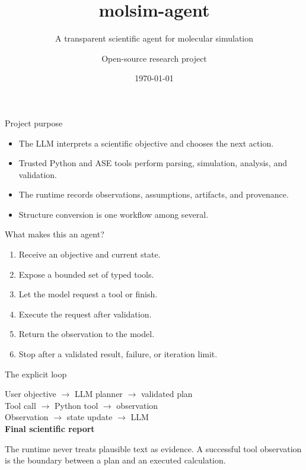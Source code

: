 \documentclass[aspectratio=169,11pt]{beamer}
\title{molsim-agent}
\subtitle{A transparent scientific agent for molecular simulation}
\author{Open-source research project}
\date{\today}
\begin{document}
\begin{frame}
  \titlepage
\end{frame}

\begin{frame}{Project purpose}
\begin{itemize}
  \item The LLM interprets a scientific objective and chooses the next action.
  \item Trusted Python and ASE tools perform parsing, simulation, analysis, and validation.
  \item The runtime records observations, assumptions, artifacts, and provenance.
  \item Structure conversion is one workflow among several.
\end{itemize}
\end{frame}

\begin{frame}{What makes this an agent?}
\begin{enumerate}
  \item Receive an objective and current state.
  \item Expose a bounded set of typed tools.
  \item Let the model request a tool or finish.
  \item Execute the request after validation.
  \item Return the observation to the model.
  \item Stop after a validated result, failure, or iteration limit.
\end{enumerate}
\end{frame}

\begin{frame}{The explicit loop}
\begin{center}
\Large User objective $\rightarrow$ LLM planner $\rightarrow$ validated plan\\[0.4em]
Tool call $\rightarrow$ Python tool $\rightarrow$ observation\\[0.4em]
Observation $\rightarrow$ state update $\rightarrow$ LLM\\[0.4em]
\textbf{Final scientific report}
\end{center}
\vspace{0.5em}
The runtime never treats plausible text as evidence. A successful tool observation is the
boundary between a plan and an executed calculation.
\end{frame}
\end{document}
